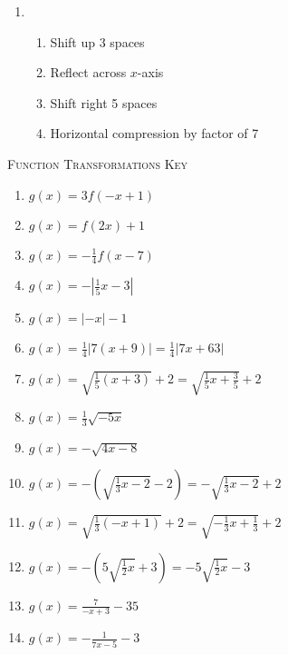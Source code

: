 \begin{enumerate}	\setcounter{enumi}{\value{Review}}
\item \begin{enumerate}[(1)]
\setlength\itemsep{0pt}
	\item Shift up 3 spaces
	\item Reflect across $x$-axis
	\item Shift right 5 spaces
	\item Horizontal compression by factor of 7
\end{enumerate}
\setcounter{Review}{\value{enumi}}
\end{enumerate}

\newpage

\textsc{Function Transformations Key} 

\begin{enumerate}
	\item $g(x) = 3f(-x+1)$
	\item $g(x) = f(2x)+1$
	\item $g(x) = -\frac{1}{4}f(x-7)$
    \item $g(x) = -\left|\frac{1}{5}x-3\right|$
    \item $g(x) = |-x|-1$
    \item $g(x) = \frac{1}{4}|7(x+9)| = \frac{1}{4}|7x+63|$
    \item $g(x) = \sqrt{\frac{1}{5}(x+3)} + 2 = \sqrt{\frac{1}{5}x + \frac{3}{5}}+2$
    \item $g(x) = \frac{1}{3}\sqrt{-5x}$
    \item $g(x) = -\sqrt{4x-8}$
    \item $g(x) = -\left(\sqrt{\frac{1}{3}x-2}-2\right) = -\sqrt{\frac{1}{3}x-2}+2$
     \item $g(x) = \sqrt{\frac{1}{3}(-x+1)}+2 = \sqrt{-\frac{1}{3}x+\frac{1}{3}}+2$
     \item $g(x) = -\left(5\sqrt{\frac{1}{2}x}+3\right) = -5\sqrt{\frac{1}{2}x} - 3$
     \item $g(x) = \frac{7}{-x+3} - 35$
     \item $g(x) = -\frac{1}{7x-5} - 3$ 
\end{enumerate}

